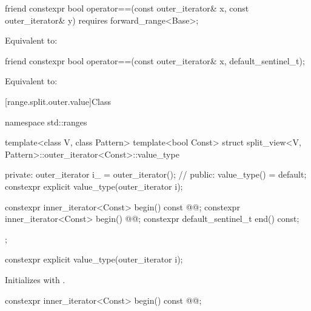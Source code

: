 \documentclass{wg21}
\begin{document}
%
\begin{itemdecl}
friend constexpr bool operator==(const outer_iterator& x, const outer_iterator& y)
requires forward_range<Base>;
\end{itemdecl}

\begin{itemdescr}
\pnum
\effects Equivalent to: 
\end{itemdescr}

%
\begin{itemdecl}
friend constexpr bool operator==(const outer_iterator& x, default_sentinel_t);
\end{itemdecl}

\begin{itemdescr}
\pnum
\effects
Equivalent to: 
\end{itemdescr}

[range.split.outer.value]{Class }

\begin{codeblock}
namespace std::ranges {
	template<class V, class Pattern>
	template<bool Const>
	struct split_view<V, Pattern>::outer_iterator<Const>::value_type {
		private:
		outer_iterator i_ = outer_iterator();               // \expos
		public:
		value_type() = default;
		constexpr explicit value_type(outer_iterator i);

		constexpr inner_iterator<Const> begin() const @@;
		constexpr inner_iterator<Const> begin() @@;
		constexpr default_sentinel_t end() const;
	};
}
\end{codeblock}

%
\begin{itemdecl}
constexpr explicit value_type(outer_iterator i);
\end{itemdecl}

\begin{itemdescr}
\pnum
\effects Initializes  with .
\end{itemdescr}

%
\begin{itemdecl}
constexpr inner_iterator<Const> begin() const @@;
\end{itemdecl}
\end{document}
